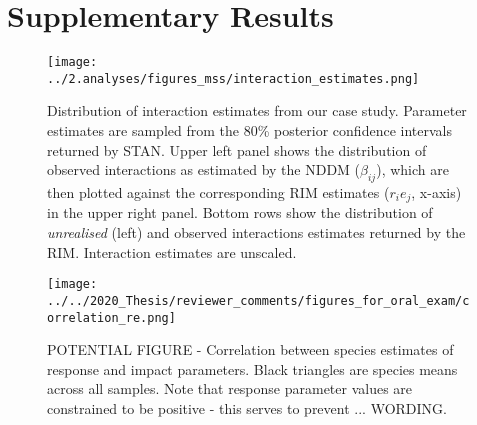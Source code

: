 \documentclass[a4,12pt]{article}
\begin{document}
\section{Supplementary Results}


    \begin{figure}[H]
        \texttt{[image: ../2.analyses/figures\_mss/interaction\_estimates.png]}
        \caption{Distribution of interaction estimates from our case study. Parameter estimates are sampled from the 80\% posterior confidence intervals returned by STAN. Upper left panel shows the distribution of observed interactions as estimated by the NDDM ($\beta_{ij}$), which are then plotted against the corresponding RIM estimates ($r_i e_j$, x-axis) in the upper right panel. Bottom rows show the distribution of \textit{unrealised} (left) and observed interactions estimates returned by the RIM. Interaction estimates are unscaled.}
        \label{fig:adist}
    \end{figure}

        \begin{figure}[H]
        \texttt{[image: ../../2020\_Thesis/reviewer\_comments/figures\_for\_oral\_exam/correlation\_re.png]}
        \caption{POTENTIAL FIGURE - Correlation between species estimates of response and impact parameters. Black triangles are species means across all samples. Note that response parameter values are constrained to be positive - this serves to prevent ... WORDING.}
        \label{fig:corrRE}
    \end{figure} 
\end{document}
